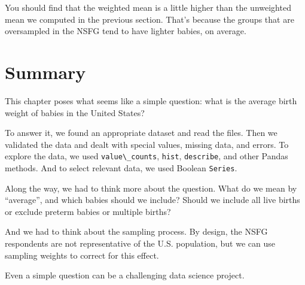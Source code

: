 You should find that the weighted mean is a little higher than the
unweighted mean we computed in the previous section. That's because the
groups that are oversampled in the NSFG tend to have lighter babies, on
average.

\hypertarget{summary}{%
\section{Summary}\label{summary}}

This chapter poses what seems like a simple question: what is the
average birth weight of babies in the United States?

To answer it, we found an appropriate dataset and read the files. Then
we validated the data and dealt with special values, missing data, and
errors. To explore the data, we used
\passthrough{\lstinline!value\_counts!}, \passthrough{\lstinline!hist!},
\passthrough{\lstinline!describe!}, and other Pandas methods. And to
select relevant data, we used Boolean \passthrough{\lstinline!Series!}.

Along the way, we had to think more about the question. What do we mean
by ``average'', and which babies should we include? Should we include
all live births or exclude preterm babies or multiple births?

And we had to think about the sampling process. By design, the NSFG
respondents are not representative of the U.S. population, but we can
use sampling weights to correct for this effect.

Even a simple question can be a challenging data science project.


